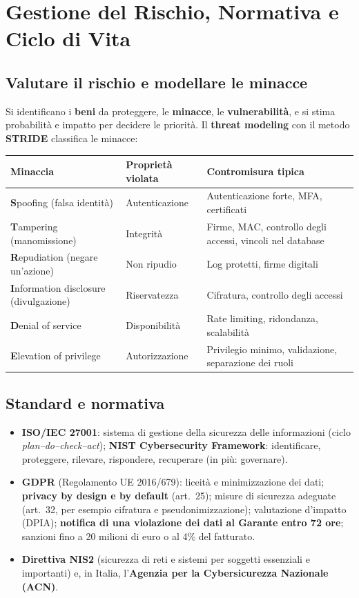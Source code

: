 \section{Gestione del Rischio, Normativa e Ciclo di Vita}

\subsection{Valutare il rischio e modellare le minacce}
Si identificano i \textbf{beni} da proteggere, le \textbf{minacce}, le \textbf{vulnerabilità}, e si stima probabilità e impatto per decidere le priorità. Il \textbf{threat modeling} con il metodo \textbf{STRIDE} classifica le minacce:
\begin{center}
\small
\begin{tabularx}{\textwidth}{@{}>{\raggedright\arraybackslash}p{3cm}>{\raggedright\arraybackslash}p{3.4cm}X@{}}
\toprule
\textbf{Minaccia} & \textbf{Proprietà violata} & \textbf{Contromisura tipica} \\
\midrule
\textbf{S}poofing (falsa identità) & Autenticazione & Autenticazione forte, MFA, certificati \\
\textbf{T}ampering (manomissione) & Integrità & Firme, MAC, controllo degli accessi, vincoli nel database \\
\textbf{R}epudiation (negare un'azione) & Non ripudio & Log protetti, firme digitali \\
\textbf{I}nformation disclosure (divulgazione) & Riservatezza & Cifratura, controllo degli accessi \\
\textbf{D}enial of service & Disponibilità & Rate limiting, ridondanza, scalabilità \\
\textbf{E}levation of privilege & Autorizzazione & Privilegio minimo, validazione, separazione dei ruoli \\
\bottomrule
\end{tabularx}
\end{center}

\subsection{Standard e normativa}
\begin{itemize}
    \item \textbf{ISO/IEC 27001}: sistema di gestione della sicurezza delle informazioni (ciclo \emph{plan--do--check--act}); \textbf{NIST Cybersecurity Framework}: identificare, proteggere, rilevare, rispondere, recuperare (in più: governare).
    \item \textbf{GDPR} (Regolamento UE 2016/679): liceità e minimizzazione dei dati; \textbf{privacy by design e by default} (art.~25); misure di sicurezza adeguate (art.~32, per esempio cifratura e pseudonimizzazione); valutazione d'impatto (DPIA); \textbf{notifica di una violazione dei dati al Garante entro 72 ore}; sanzioni fino a 20 milioni di euro o al 4\% del fatturato.
    \item \textbf{Direttiva NIS2} (sicurezza di reti e sistemi per soggetti essenziali e importanti) e, in Italia, l'\textbf{Agenzia per la Cybersicurezza Nazionale (ACN)}.
\end{itemize}

